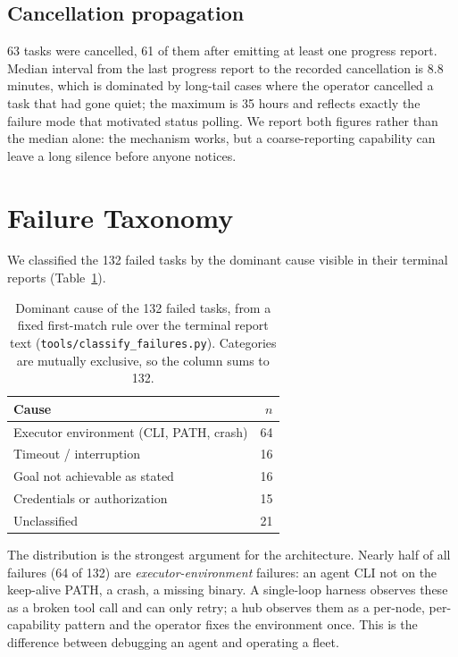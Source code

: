 \documentclass{article}
\begin{document}
\subsection{Cancellation propagation}

63 tasks were cancelled, 61 of them after emitting at least one progress report.
Median interval from the last progress report to the recorded cancellation is 8.8
minutes, which is dominated by long-tail cases where the operator cancelled a task
that had gone quiet; the maximum is 35 hours and reflects exactly the failure mode
that motivated status polling. We report both figures rather than the median alone:
the mechanism works, but a coarse-reporting capability can leave a long silence
before anyone notices.

\section{Failure Taxonomy}
\label{sec:failures}

We classified the 132 failed tasks by the dominant cause visible in their terminal
reports (Table~\ref{tab:fail}).

\begin{table}[t]
\centering\small
\caption{Dominant cause of the 132 failed tasks, from a fixed first-match rule over
the terminal report text (\texttt{tools/classify\_failures.py}). Categories are
mutually exclusive, so the column sums to 132.}
\label{tab:fail}
\begin{tabular}{@{}lr@{}}
\toprule
Cause & $n$ \\
\midrule
Executor environment (CLI, PATH, crash) & 64 \\
Timeout / interruption                  & 16 \\
Goal not achievable as stated           & 16 \\
Credentials or authorization            & 15 \\
Unclassified                            & 21 \\
\bottomrule
\end{tabular}
\end{table}

The distribution is the strongest argument for the architecture. Nearly half of all
failures (64 of 132) are \emph{executor-environment} failures: an agent CLI not on
the keep-alive PATH, a crash, a missing binary. A single-loop harness observes these as a broken
tool call and can only retry; a hub observes them as a per-node, per-capability
pattern and the operator fixes the environment once. This is the difference between
debugging an agent and operating a fleet.
\end{document}
